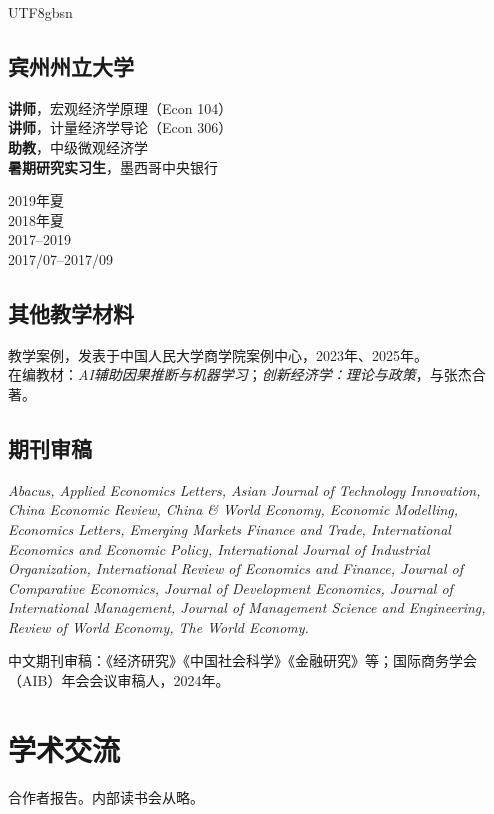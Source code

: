 \documentclass[letterpaper]{article}
\begin{document}
\begin{CJK}{UTF8}{gbsn}
\subsection*{宾州州立大学}
\begin{minipage}{0.8\textwidth}
  \textbf{讲师}，宏观经济学原理（Econ 104） \\
  \textbf{讲师}，计量经济学导论（Econ 306） \\
  \textbf{助教}，中级微观经济学 \\
  \textbf{暑期研究实习生}，墨西哥中央银行
\end{minipage}
\begin{minipage}{0.2\textwidth}
  \raggedleft
  2019年夏 \\
  2018年夏 \\
  2017--2019 \\
  2017/07--2017/09
\end{minipage}

\subsection*{其他教学材料}
教学案例，发表于中国人民大学商学院案例中心，2023年、2025年。 \\
在编教材：\textit{AI辅助因果推断与机器学习}；\textit{创新经济学：理论与政策}，与张杰合著。

\subsection*{期刊审稿}
{\it Abacus, Applied Economics Letters, Asian Journal of Technology Innovation, China Economic Review, China \& World Economy, Economic Modelling, Economics Letters, Emerging Markets Finance and Trade, International Economics and Economic Policy, International Journal of Industrial Organization, International Review of Economics and Finance, Journal of Comparative Economics, Journal of Development Economics, Journal of International Management, Journal of Management Science and Engineering, Review of World Economy, The World Economy.}

中文期刊审稿：《经济研究》《中国社会科学》《金融研究》等；国际商务学会（AIB）年会会议审稿人，2024年。

\section*{学术交流}
{\footnotesize * 合作者报告。内部读书会从略。}


\end{CJK}
\end{document}
